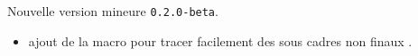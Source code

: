 Nouvelle version mineure \verb+0.2.0-beta+.

\begin{itemize}[itemsep=.5em]
    \item {}
          ajout de la macro  pour tracer facilement des sous cadres non \og finaux \fg.
\end{itemize}

\separation